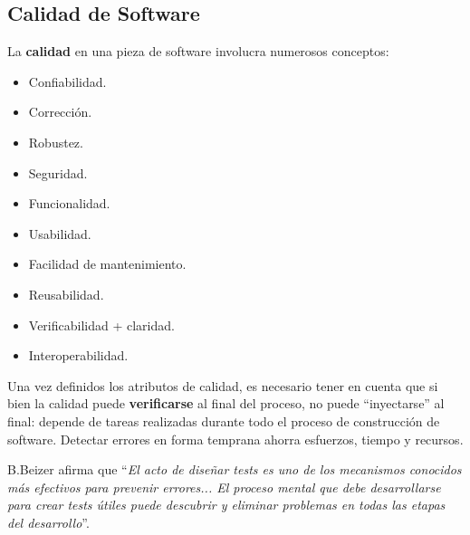 \documentclass[]{article}
\begin{document}
\subsection{Calidad de Software}
La \textbf{calidad} en una pieza de software involucra numerosos conceptos:
\begin{multicols}{2}
	\begin{itemize}
		\item Confiabilidad.
		\item Corrección.
		\item Robustez.
		\item Seguridad.
		\item Funcionalidad.
		\item Usabilidad.
		\item Facilidad de mantenimiento.
		\item Reusabilidad.
		\item Verificabilidad + claridad.
		\item Interoperabilidad.
	\end{itemize}
\end{multicols}

Una vez definidos los atributos de calidad, es necesario tener en cuenta que si bien la calidad puede \textbf{verificarse} al final del proceso, no puede ``inyectarse'' al final: depende de tareas realizadas durante todo el proceso de construcción de software. Detectar errores en forma temprana ahorra esfuerzos, tiempo y recursos.

B.Beizer afirma que ``\textit{El acto de diseñar tests es uno de los mecanismos conocidos más efectivos para prevenir errores... El proceso mental que debe desarrollarse para crear tests útiles puede descubrir y eliminar problemas en todas las etapas del desarrollo}''.
\end{document}
